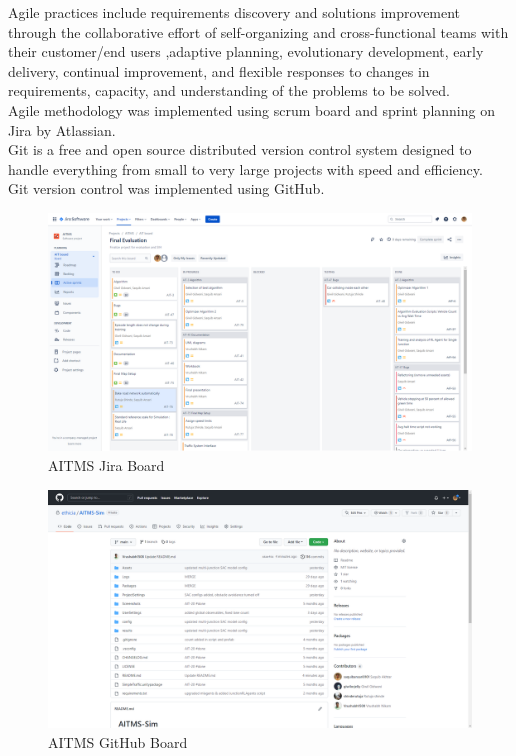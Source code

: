 \documentclass[openany,12pt]{report}
\begin{document}
	\hspace*{0.5 in}Agile practices include requirements discovery and solutions improvement through the collaborative effort of self-organizing and cross-functional teams with their customer/end users ,adaptive planning, evolutionary development, early delivery, continual improvement, and flexible responses to changes in requirements, capacity, and understanding of the problems to be solved.\\
	\hspace*{0.5in}Agile methodology was implemented using scrum board and sprint planning on Jira by Atlassian.\\
	\hspace*{0.5in}Git is a free and open source distributed version control system designed to handle everything from small to very large projects with speed and efficiency.\\
	\hspace*{0.5in}Git version control was implemented using GitHub.
	\begin{figure}[H]
			\centering
			\includegraphics[width=6in]{./Diagrams/PNG/jira}
			\caption{AITMS Jira Board}
	\end{figure}	
	
	\begin{figure}[H]
			\centering
			\includegraphics[width=6in]{./Diagrams/PNG/github}
			\caption{AITMS GitHub Board}
	\end{figure}	
	
\end{document}

